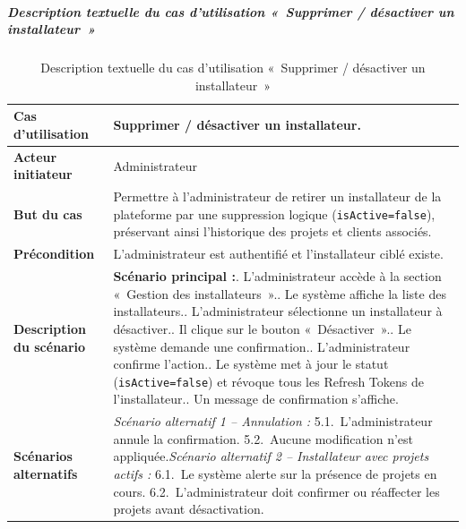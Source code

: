 \subparagraph{Description textuelle du cas d'utilisation «~Supprimer / désactiver un installateur~»}

\begin{table}[H]
  \caption{Description textuelle du cas d'utilisation «~Supprimer / désactiver un installateur~»}
  \label{tab:cu-supprimer-installateur}
  \centering
  \begin{tabularx}{\textwidth}{|L{3.8cm}|X|}
    \hline
    \textbf{Cas d'utilisation} & Supprimer / désactiver un installateur. \\
    \hline
    \textbf{Acteur initiateur} & Administrateur \\
    \hline
    \textbf{But du cas} & Permettre à l'administrateur de retirer un installateur de la plateforme par une suppression logique (\texttt{isActive=false}), préservant ainsi l'historique des projets et clients associés. \\
    \hline
    \textbf{Précondition} & L'administrateur est authentifié et l'installateur ciblé existe. \\
    \hline
    \textbf{Description du scénario} &
    \textbf{Scénario principal :}. L'administrateur accède à la section «~Gestion des installateurs~».. Le système affiche la liste des installateurs.. L'administrateur sélectionne un installateur à désactiver.. Il clique sur le bouton «~Désactiver~».. Le système demande une confirmation.. L'administrateur confirme l'action.. Le système met à jour le statut (\texttt{isActive=false}) et révoque tous les Refresh Tokens de l'installateur.. Un message de confirmation s'affiche.\\
    \hline
    \textbf{Scénarios alternatifs} &
    \textit{Scénario alternatif 1 -- Annulation :}\newline
    \hspace*{6pt}5.1.~L'administrateur annule la confirmation.\newline
    \hspace*{6pt}5.2.~Aucune modification n'est appliquée.\newline[2pt]
    \textit{Scénario alternatif 2 -- Installateur avec projets actifs :}\newline
    \hspace*{6pt}6.1.~Le système alerte sur la présence de projets en cours.\newline
    \hspace*{6pt}6.2.~L'administrateur doit confirmer ou réaffecter les projets avant désactivation.\\
    \hline
  \end{tabularx}
\end{table}

